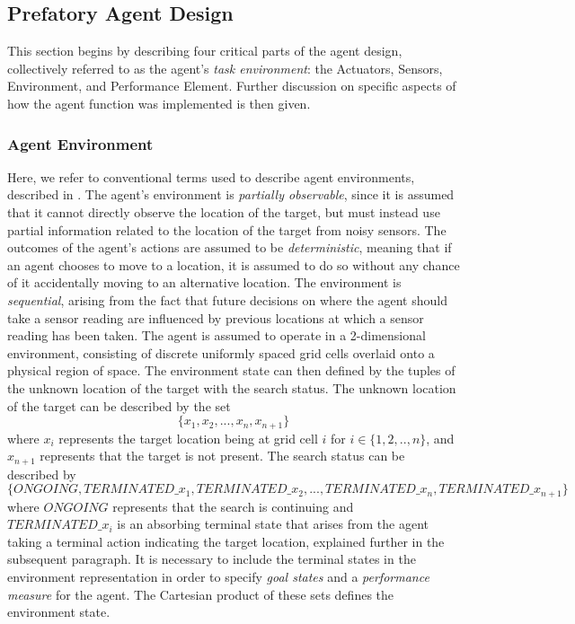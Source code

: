 \subsection{Prefatory Agent Design}\label{subsection:intial_agent_design}

This section begins by describing four critical parts of the agent design, collectively referred to as the agent's \textit{task environment}: the Actuators, Sensors, Environment, and Performance Element. Further discussion on specific aspects of how the agent function was implemented is then given.

\subsubsection{Agent Environment}
Here, we refer to conventional terms used to describe agent environments, described in \cite[p.~41]{AIAMA}. The agent's environment is \textit{partially observable}, since it is assumed that it cannot directly observe the location of the target, but must instead use partial information related to the location of the target from noisy sensors. The outcomes of the agent's actions are assumed to be \textit{deterministic}, meaning that if an agent chooses to move to a location, it is assumed to do so without any chance of it accidentally moving to an alternative location. The environment is \textit{sequential}, arising from the fact that future decisions on where the agent should take a sensor reading are influenced by previous locations at which a sensor reading has been taken. The agent is assumed to operate in a 2-dimensional environment, consisting of discrete uniformly spaced grid cells overlaid onto a physical region of space. The environment state can then defined by the tuples of the unknown location of the target with the search status. The unknown location of the target can be described by the set
\[\{x_1, x_2, ..., x_n, x_{n+1}\}\]
where $x_i$ represents the target location being at grid cell $i$ for $i \in \{1, 2, .., n\}$, and $x_{n+1}$ represents that the target is not present. The search status can be described by 
\[ \{ONGOING, TERMINATED\_x_1, TERMINATED\_x_2, ..., TERMINATED\_x_n, TERMINATED\_x_{n+1}\} \]
where $ONGOING$ represents that the search is continuing and $TERMINATED\_x_i$ is an absorbing terminal state that arises from the agent taking a terminal action indicating the target location, explained further in the subsequent paragraph. It is necessary to include the terminal states in the environment representation in order to specify \textit{goal states} and a \textit{performance measure} for the agent. The Cartesian product of these sets defines the environment state.

